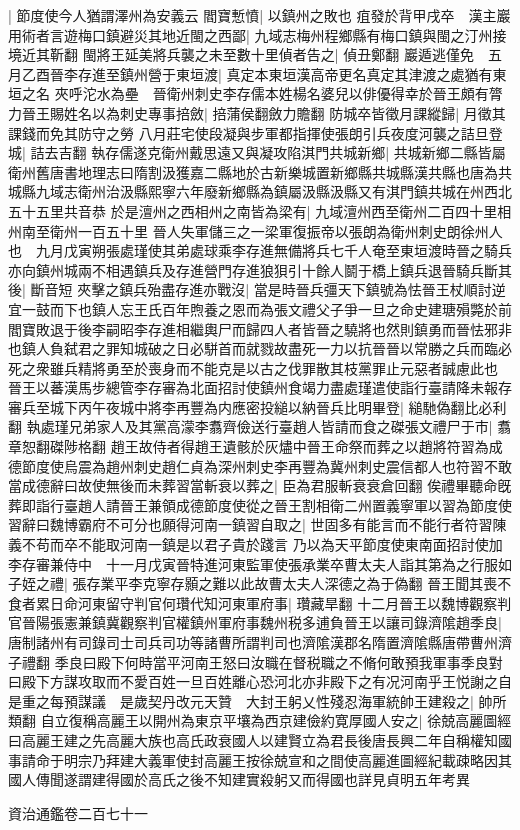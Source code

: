 |{
	節度使今人猶謂澤州為安義云}
閻寶慙憤|{
	以鎮州之敗也}
疽發於背甲戌卒　漢主巖用術者言遊梅口鎮避災其地近閩之西鄙|{
	九域志梅州程鄉縣有梅口鎮與閩之汀州接境近其靳翻}
閩將王延美將兵襲之未至數十里偵者告之|{
	偵丑鄭翻}
巖遁逃僅免　五月乙酉晉李存進至鎮州營于東垣渡|{
	真定本東垣漢高帝更名真定其津渡之處猶有東垣之名}
夾呼沱水為壘　晉衛州刺史李存儒本姓楊名婆兒以俳優得幸於晉王頗有膂力晉王賜姓名以為刺史專事掊斂|{
	掊蒲侯翻斂力贍翻}
防城卒皆徵月課縱歸|{
	月徵其課錢而免其防守之勞}
八月莊宅使段凝與步軍都指揮使張朗引兵夜度河襲之詰旦登城|{
	詰去吉翻}
執存儒遂克衛州戴思遠又與凝攻陷淇門共城新鄉|{
	共城新鄉二縣皆屬衛州舊唐書地理志曰隋割汲獲嘉二縣地於古新樂城置新鄉縣共城縣漢共縣也唐為共城縣九域志衛州治汲縣熙寧六年廢新鄉縣為鎮屬汲縣汲縣又有淇門鎮共城在州西北五十五里共音恭}
於是澶州之西相州之南皆為梁有|{
	九域澶州西至衛州二百四十里相州南至衛州一百五十里}
晉人失軍儲三之一梁軍復振帝以張朗為衛州刺史朗徐州人也　九月戊寅朔張處瑾使其弟處球乘李存進無備將兵七千人奄至東垣渡時晉之騎兵亦向鎮州城兩不相遇鎮兵及存進營門存進狼狽引十餘人鬬于橋上鎮兵退晉騎兵斷其後|{
	斷音短}
夾擊之鎮兵殆盡存進亦戰沒|{
	當是時晉兵彊天下鎮號為怯晉王杖順討逆宜一鼓而下也鎮人忘王氏百年煦養之恩而為張文禮父子爭一旦之命史建瑭殞斃於前閻寶敗退于後李嗣昭李存進相繼輿尸而歸四人者皆晉之驍將也然則鎮勇而晉怯邪非也鎮人負弑君之罪知城破之日必駢首而就戮故盡死一力以抗晉晉以常勝之兵而臨必死之衆雖兵精將勇至於喪身而不能克是以古之伐罪散其枝黨罪止元惡者誠慮此也}
晉王以蕃漢馬步總管李存審為北面招討使鎮州食竭力盡處瑾遣使詣行臺請降未報存審兵至城下丙午夜城中將李再豐為内應密投縋以納晉兵比明畢登|{
	縋馳偽翻比必利翻}
執處瑾兄弟家人及其黨高濛李翥齊儉送行臺趙人皆請而食之磔張文禮尸于市|{
	翥章恕翻磔陟格翻}
趙王故侍者得趙王遺骸於灰燼中晉王命祭而葬之以趙將符習為成德節度使烏震為趙州刺史趙仁貞為深州刺史李再豐為冀州刺史震信都人也符習不敢當成德辭曰故使無後而未葬習當斬衰以葬之|{
	臣為君服斬衰衰倉回翻}
俟禮畢聽命旣葬即詣行臺趙人請晉王兼領成德節度使從之晉王割相衛二州置義寧軍以習為節度使習辭曰魏博霸府不可分也願得河南一鎮習自取之|{
	世固多有能言而不能行者符習陳義不苟而卒不能取河南一鎮是以君子貴於踐言}
乃以為天平節度使東南面招討使加李存審兼侍中　十一月戊寅晉特進河東監軍使張承業卒曹太夫人詣其第為之行服如子姪之禮|{
	張存業平李克寧存顥之難以此故曹太夫人深德之為于偽翻}
晉王聞其喪不食者累日命河東留守判官何瓚代知河東軍府事|{
	瓚藏旱翻}
十二月晉王以魏博觀察判官晉陽張憲兼鎮冀觀察判官權鎮州軍府事魏州税多逋負晉王以讓司錄濟隂趙季良|{
	唐制諸州有司錄司士司兵司功等諸曹所謂判司也濟隂漢郡名隋置濟隂縣唐帶曹州濟子禮翻}
季良曰殿下何時當平河南王怒曰汝職在督税職之不脩何敢預我軍事季良對曰殿下方謀攻取而不愛百姓一旦百姓離心恐河北亦非殿下之有况河南乎王悦謝之自是重之每預謀議　是歲契丹改元天贊　大封王躬乂性殘忍海軍統帥王建殺之|{
	帥所類翻}
自立復稱高麗王以開州為東京平壤為西京建儉約寛厚國人安之|{
	徐兢高麗圖經曰高麗王建之先高麗大族也高氏政衰國人以建賢立為君長後唐長興二年自稱權知國事請命于明宗乃拜建大義軍使封高麗王按徐兢宣和之間使高麗進圖經紀載疎略因其國人傳聞遂謂建得國於高氏之後不知建實殺躬又而得國也詳見貞明五年考異}


資治通鑑卷二百七十一

